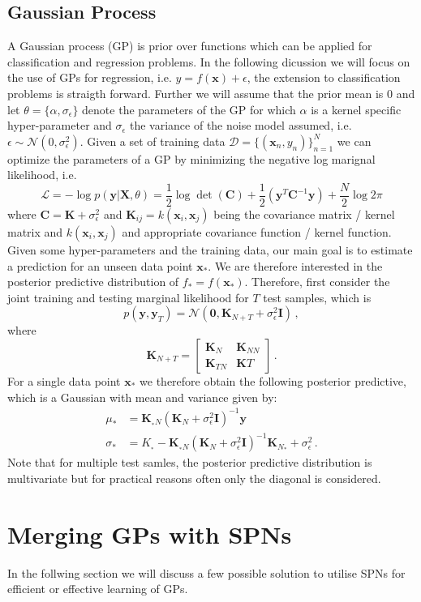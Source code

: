 \documentclass[10pt,letterpaper]{article}
\newcommand\N{\ensuremath{\mathcal{N}}}
\newcommand{\X}{\mathbf{X}}
\newcommand{\C}{\mathbf{C}}
\newcommand{\loss}{\mathcal{L}}
\newcommand{\K}{\mathbf{K}}
\newcommand{\data}{\mathcal{D}}
\newcommand{\x}{\mathbf{x}}
\newcommand{\y}{\mathbf{y}}
\newcommand{\xn}{\mathbf{x}_{n}}
\newcommand{\new}{_{*}}
\theoremstyle{mystyle}
\begin{document}
\subsection{Gaussian Process} \label{sec:gps}
A Gaussian process (GP) is prior over functions which can be applied for classification and regression problems.
In the following dicussion we will focus on the use of GPs for regression, i.e. $y = f(\x) + \epsilon$, the extension to classification problems is straigth forward.
Further we will assume that the prior mean is $0$ and let $\theta = \{\alpha, \sigma_{\epsilon}\}$ denote the parameters of the GP for which $\alpha$ is a kernel specific hyper-parameter and $\sigma_{\epsilon}$ the variance of the noise model assumed, i.e. $\epsilon \sim \N(0, \sigma_{\epsilon}^2)$.
Given a set of training data $\data = \{(\xn, y_n)\}_{n=1}^{N}$ we can optimize the parameters of a GP by minimizing the negative log marignal likelihood, i.e.
\[
  \loss = - \log p(\y | \X, \theta) = \frac{1}{2} \log \det(\C) + \frac{1}{2}(\y^T \C^{-1} \y) + \frac{N}{2} \log 2\pi
\]
where $\C = \K + \sigma^2_{\epsilon}$ and $\K_{ij} = k(\x_i, \x_j)$ being the covariance matrix / kernel matrix and $k(\x_i, \x_j)$ and appropriate covariance function / kernel function.
Given some hyper-parameters and the training data, our main goal is to estimate a prediction for an unseen data point $\x\new$. 
We are therefore interested in the posterior predictive distribution of $f\new = f(\x\new)$.
Therefore, first consider the joint training and testing marginal likelihood for $T$ test samples, which is
\[
  p(\y, \y_T) = \N(\bm 0, \K_{N+T} + \sigma^2_{\epsilon}\bm I) \, ,
\]
where
\[
\K_{N+T} = \left[ \begin{array}{cc}
\K_{N} & \K_{NN} \\
\K_{TN} & \K{T} \end{array} \right] \, .
\]
For a single data point $\x\new$ we therefore obtain the following posterior predictive, which is a Gaussian with mean and variance given by:
\begin{align}
  \mu\new &= \K_{\new N} (\K_N + \sigma^2_{\epsilon}\bm I)^{-1} \y \\
  \sigma\new &= K_{\new} - \K_{\new N}(\K_N + \sigma^2_{\epsilon}\bm I)^{-1} \K_{N \new} + \sigma^2_{\epsilon} \, .
\end{align}
Note that for multiple test samles, the posterior predictive distribution is multivariate but for practical reasons often only the diagonal is considered.

\section{Merging GPs with SPNs}
In the follwing section we will discuss a few possible solution to utilise SPNs for efficient or effective learning of GPs.









\end{document}
